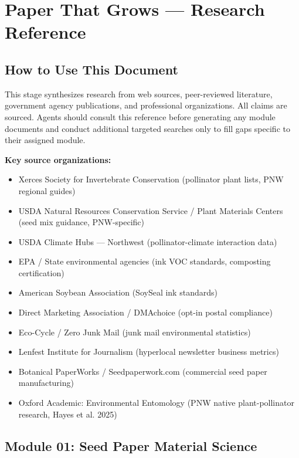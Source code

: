 \documentclass[11pt,letterpaper]{article}
\newcommand{\stageheader}[2]{%
  \noindent\colorbox{#2}{\makebox[\textwidth][l]{%
    \textcolor{white}{\bfseries\sffamily\hspace{6pt}#1\hspace{6pt}}}}%
  \vspace{0.5em}\par%
}
\begin{document}
\newpage

\stageheader{STAGE 2 --- RESEARCH REFERENCE}{stageB}

\section{Paper That Grows --- Research Reference}

\subsection{How to Use This Document}
This stage synthesizes research from web sources, peer-reviewed literature, government agency publications, and professional organizations. All claims are sourced. Agents should consult this reference before generating any module documents and conduct additional targeted searches only to fill gaps specific to their assigned module.

\textbf{Key source organizations:}
\begin{itemize}[leftmargin=1.5em]
  \item Xerces Society for Invertebrate Conservation (pollinator plant lists, PNW regional guides)
  \item USDA Natural Resources Conservation Service / Plant Materials Centers (seed mix guidance, PNW-specific)
  \item USDA Climate Hubs --- Northwest (pollinator-climate interaction data)
  \item EPA / State environmental agencies (ink VOC standards, composting certification)
  \item American Soybean Association (SoySeal ink standards)
  \item Direct Marketing Association / DMAchoice (opt-in postal compliance)
  \item Eco-Cycle / Zero Junk Mail (junk mail environmental statistics)
  \item Lenfest Institute for Journalism (hyperlocal newsletter business metrics)
  \item Botanical PaperWorks / Seedpaperwork.com (commercial seed paper manufacturing)
  \item Oxford Academic: Environmental Entomology (PNW native plant-pollinator research, Hayes et al. 2025)
\end{itemize}

\subsection{Module 01: Seed Paper Material Science}
\end{document}
